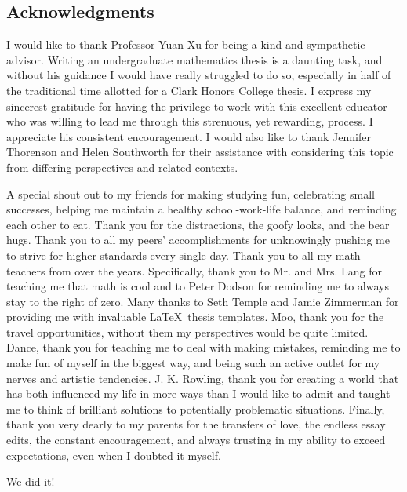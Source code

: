 \documentclass[letterpaper, 12pt]{article}
\begin{document}


\newpage
\begin{centering}\section*{Acknowledgments}\end{centering}

I would like to thank Professor Yuan Xu for being a kind and sympathetic advisor. Writing an undergraduate mathematics thesis is a daunting task, and without his guidance I would have really struggled to do so, especially in half of the traditional time allotted for a Clark Honors College thesis. I express my sincerest gratitude for having the privilege to work with this excellent educator who was willing to lead me through this strenuous, yet rewarding, process. I appreciate his consistent encouragement. I would also like to thank Jennifer Thorenson and Helen Southworth for their assistance with considering this topic from differing perspectives and related contexts. 

A special shout out to my friends for making studying fun, celebrating small successes, helping me maintain a healthy school-work-life balance, and reminding each other to eat. Thank you for the distractions, the goofy looks, and the bear hugs. Thank you to all my peers' accomplishments for unknowingly pushing me to strive for higher standards every single day. Thank you to all my math teachers from over the years. Specifically, thank you to Mr. and Mrs. Lang for teaching me that math is cool and to Peter Dodson for reminding me to always stay to the right of zero. Many thanks to Seth Temple and Jamie Zimmerman for providing me with invaluable \LaTeX\ thesis templates. Moo, thank you for the travel opportunities, without them my perspectives would be quite limited. Dance, thank you for teaching me to deal with making mistakes, reminding me to make fun of myself in the biggest way, and being such an active outlet for my nerves and artistic tendencies. J. K. Rowling, thank you for creating a world that has both influenced my life in more ways than I would like to admit and taught me to think of brilliant solutions to potentially problematic situations. Finally, thank you very dearly to my parents for the transfers of love, the endless essay edits, the constant encouragement, and always trusting in my ability to exceed expectations, even when I doubted it myself.

We did it!
\end{document}
